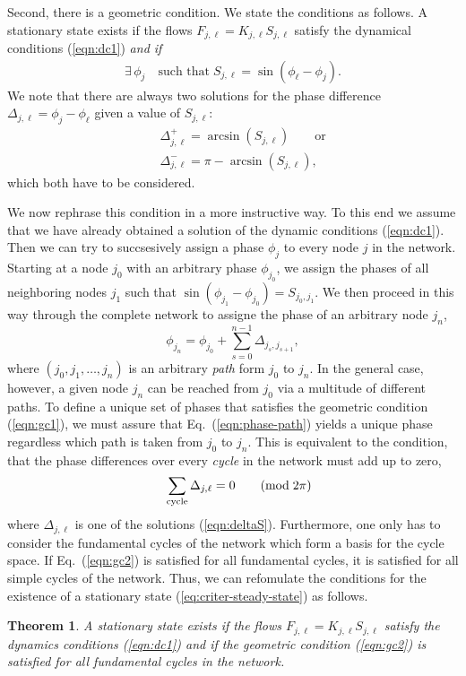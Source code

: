 \documentclass[10pt,aps,pra,twocolumn,superscriptaddress]{revtex4-1}
\newtheorem{thm}{Theorem}
\newcommand{\be}{\begin{equation}}
\newcommand{\ee}{\end{equation}}
\newcommand{\bea}{\begin{eqnarray}}
\newcommand{\eea}{\end{eqnarray}}
\newcommand{\nn}{\nonumber}
\begin{document}
Second, there is a geometric condition.  We state the conditions as follows.
A stationary state exists if the flows 
$F_{j,\ell} = K_{j,\ell} S_{j,\ell}$
satisfy the dynamical conditions (\ref{eqn:dc1}) 
\emph{and if}  
\bea
    \exists \, \phi_j \quad \mbox{such that}  \;
    S_{j,\ell} = \sin(\phi_\ell - \phi_j).
  \label{eqn:gc1}
\eea
We note that there are always two solutions for the phase 
difference $\Delta_{j,\ell} = \phi_j - \phi_\ell$ given a value
of $S_{j,\ell}$:
\bea
     && \Delta_{j,\ell}^+ = \arcsin(S_{j,\ell}) 
      \qquad \mbox{or} \nn \\
    && \Delta_{j,\ell}^- = \pi -  \arcsin(S_{j,\ell}),
     \label{eqn:deltaS} 
\eea
which both have to be considered.

We now rephrase this condition in a more instructive way.
To this end we assume that we have already obtained a solution
of the dynamic conditions (\ref{eqn:dc1}). Then we can try to
succsesively assign a phase $\phi_j$ to every node $j$ in the
network. Starting at a node $j_0$ with an arbitrary phase
$\phi_{j_0}$, we assign the phases of all neighboring nodes
$j_1$ such that $\sin(\phi_{j_1}   -   \phi_{j_0}) = S_{j_0,j_1}$.
We then proceed in this way through the complete network
to assigne the phase of an arbitrary node $j_n$,
\be
   \phi_{j_n} = \phi_{j_0} + \sum_{s=0}^{n-1}
      \Delta_{j_s,j_{s+1}},
   \label{eqn:phase-path}
\ee
where $(j_0,j_1,\ldots,j_n)$ is an arbitrary \emph{path} form
$j_0$ to $j_n$. 
In the general case, however, a given node $j_n$ can be reached
from $j_0$ via a multitude of different paths. To define a unique
set of phases that satisfies the geometric condition (\ref{eqn:gc1}),
we must assure that Eq.~(\ref{eqn:phase-path}) yields a unique 
phase regardless which path is taken from $j_0$ to $j_n$.
This is equivalent to the condition, that the phase 
differences over every \emph{cycle} in the network 
must add up to zero,
\bea
       \label{eqn:gc2}
    && \sum_{\rm cycle} \Delta_{j,\ell} = 0
        \qquad (\mbox{mod} \; 2 \pi) 
\eea
where $\Delta_{j,\ell}$ is one of the solutions (\ref{eqn:deltaS}). 
Furthermore, one only has to consider the fundamental
cycles of the network which form a basis for the cycle space.
If Eq.~(\ref{eqn:gc2}) is satisfied for all fundamental cycles, it is 
satisfied for all simple cycles of the network.
Thus, we can refomulate the conditions for the
existence of a stationary state (\ref{eq:criter-steady-state}) as follows.

\begin{thm}
A stationary state exists if the flows 
   $F_{j,\ell} = K_{j,\ell} S_{j,\ell}$
satisfy the dynamics conditions (\ref{eqn:dc1})  and if
the geometric condition (\ref{eqn:gc2}) is satisfied for
all fundamental cycles in the network.
\end{thm}
\end{document}
